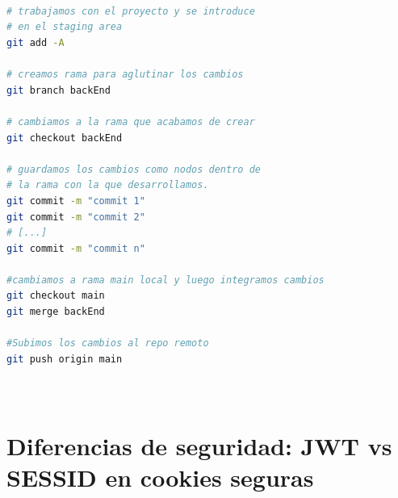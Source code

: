 \documentclass[a4paper,12pt]{report}
\begin{document}
\begin{lstlisting}[language=bash, basicstyle=\ttfamily\small]
	


# trabajamos con el proyecto y se introduce
# en el staging area
git add -A 

# creamos rama para aglutinar los cambios
git branch backEnd

# cambiamos a la rama que acabamos de crear
git checkout backEnd

# guardamos los cambios como nodos dentro de
# la rama con la que desarrollamos.	
git commit -m "commit 1"  	
git commit -m "commit 2"
# [...]
git commit -m "commit n"

#cambiamos a rama main local y luego integramos cambios
git checkout main
git merge backEnd

#Subimos los cambios al repo remoto
git push origin main 

	
\end{lstlisting}
		
	
\pagebreak

		
		
		\section{Diferencias de seguridad: JWT vs SESSID en cookies seguras}
		\label{sec:anexo_JWTvsSESSIONS}
						
\end{document}
